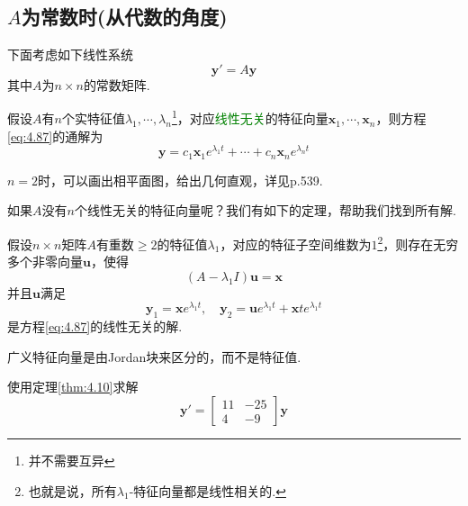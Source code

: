 \subsection{$A$为常数时(从代数的角度)}\label{sec:4.10}

下面考虑如下线性系统
\begin{equation}\label{eq:4.87}
    \mathbf{y}'=A\mathbf{y}
\end{equation}
其中$A$为$n\times n$的常数矩阵.

\begin{theorem}\label{thm:4.9}
    假设$A$有$n$个实特征值$\lambda_1,\cdots,\lambda_n$\footnote{并不需要互异}，对应\textcolor{green}{线性无关}的特征向量$\mathbf{x}_1,\cdots,\mathbf{x}_n$，则方程\ref{eq:4.87}的通解为
    \[
        \mathbf{y}=c_1\mathbf{x}_1e^{\lambda_1 t}+\cdots+c_n\mathbf{x}_ne^{\lambda_n t}
    \]
\end{theorem}

\begin{note}
    $n=2$时，可以画出相平面图，给出几何直观，详见\cite{Trench}p.539.
\end{note}

如果$A$没有$n$个线性无关的特征向量呢？我们有如下的定理，帮助我们找到所有解.

\begin{theorem}\label{thm:4.10}
    假设$n\times n$矩阵$A$有重数$\ge 2$的特征值$\lambda_1$，对应的特征子空间维数为$1$\footnote{也就是说，所有$\lambda_1$-特征向量都是线性相关的.}，则存在无穷多个非零向量$\mathbf{u}$，使得
    \[
        (A-\lambda_1 I)\mathbf{u}=\mathbf{x}
    \]
    并且$\mathbf{u}$满足
    \[
        \mathbf{y}_1=\mathbf{x}e^{\lambda_1 t},\quad \mathbf{y}_2=\mathbf{u}e^{\lambda_1 t}+\mathbf{x}te^{\lambda_1 t}
    \]
    是方程\ref{eq:4.87}的线性无关的解.
\end{theorem}

\begin{note}
    广义特征向量是由Jordan块来区分的，而不是特征值.
\end{note}

\begin{example}
    使用定理\ref{thm:4.10}求解
    \[
        \mathbf{y}'=\begin{bmatrix}
            11 & -25 \\
            4  & -9
        \end{bmatrix}\mathbf{y}
    \]
\end{example}

